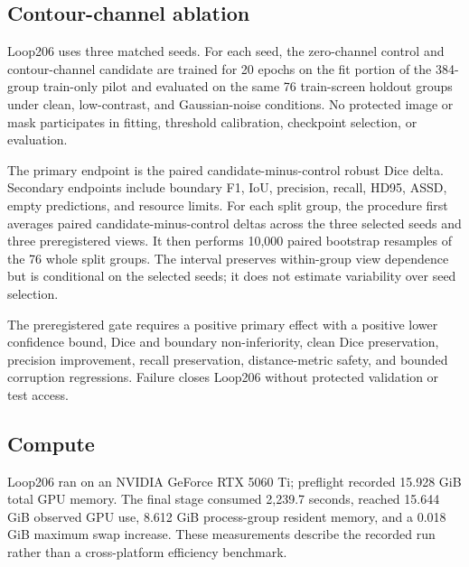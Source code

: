 \subsection{Contour-channel ablation}

Loop206 uses three matched seeds. For each seed, the zero-channel control and contour-channel candidate are trained for 20 epochs on the fit portion of the 384-group train-only pilot and evaluated on the same 76 train-screen holdout groups under clean, low-contrast, and Gaussian-noise conditions. No protected image or mask participates in fitting, threshold calibration, checkpoint selection, or evaluation.

The primary endpoint is the paired candidate-minus-control robust Dice delta. Secondary endpoints include boundary F1, IoU, precision, recall, HD95, ASSD, empty predictions, and resource limits. For each split group, the procedure first averages paired candidate-minus-control deltas across the three selected seeds and three preregistered views. It then performs 10,000 paired bootstrap resamples of the 76 whole split groups. The interval preserves within-group view dependence but is conditional on the selected seeds; it does not estimate variability over seed selection.

The preregistered gate requires a positive primary effect with a positive lower confidence bound, Dice and boundary non-inferiority, clean Dice preservation, precision improvement, recall preservation, distance-metric safety, and bounded corruption regressions. Failure closes Loop206 without protected validation or test access.

\subsection{Compute}

Loop206 ran on an NVIDIA GeForce RTX 5060 Ti; preflight recorded 15.928 GiB total GPU memory. The final stage consumed 2,239.7 seconds, reached 15.644 GiB observed GPU use, 8.612 GiB process-group resident memory, and a 0.018 GiB maximum swap increase. These measurements describe the recorded run rather than a cross-platform efficiency benchmark.
